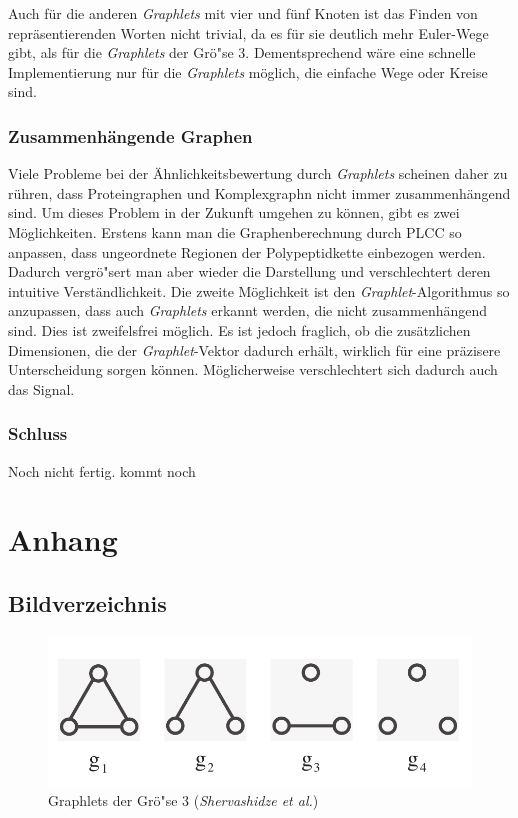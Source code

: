 \documentclass{report}
\begin{document}
Auch f\"ur die anderen \textit{Graphlets} mit vier und f\"unf Knoten ist das Finden von repr\"asentierenden Worten nicht trivial, da es f\"ur sie deutlich mehr Euler-Wege gibt, als f\"ur die \textit{Graphlets} der Gr\"o"se 3.
Dementsprechend w\"are eine schnelle Implementierung nur f\"ur die \textit{Graphlets} m\"oglich, die einfache Wege oder Kreise sind.

\subsection{Zusammenh\"angende Graphen}

Viele Probleme bei der \"Ahnlichkeitsbewertung durch \textit{Graphlets} scheinen daher zu r\"uhren, dass Proteingraphen und Komplexgraphn nicht immer zusammenh\"angend sind.
Um dieses Problem in der Zukunft umgehen zu k\"onnen, gibt es zwei M\"oglichkeiten.
Erstens kann man die Graphenberechnung durch PLCC so anpassen, dass ungeordnete Regionen der Polypeptidkette einbezogen werden. Dadurch vergr\"o"sert man aber wieder die Darstellung und verschlechtert deren intuitive Verst\"andlichkeit.
Die zweite M\"oglichkeit ist den \textit{Graphlet}-Algorithmus so anzupassen, dass auch \textit{Graphlets} erkannt werden, die nicht zusammenh\"angend sind. Dies ist zweifelsfrei m\"oglich. Es ist jedoch fraglich, ob die zus\"atzlichen Dimensionen, die der \textit{Graphlet}-Vektor dadurch erh\"alt, wirklich f\"ur eine pr\"azisere Unterscheidung sorgen k\"onnen. M\"oglicherweise verschlechtert sich dadurch auch das Signal. 


\subsection{Schluss}

Noch nicht fertig. kommt noch






\chapter{Anhang}


\section{Bildverzeichnis}

\begin{figure}[H]
\includegraphics[width =\linewidth]{3graphlets.pdf}
\caption{Graphlets der Gr\"o"se 3 (\textit{Shervashidze et al.})}
\label{fig:3graphlets}
\end{figure}
\end{document}
